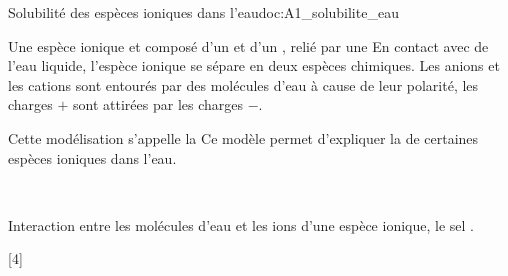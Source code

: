 \begin{doc}{Solubilité des espèces ioniques dans l'eau}{doc:A1_solubilite_eau}
  
  Une espèce ionique et composé d'un  et d'un , relié par une 
  En contact avec de l'eau liquide, l'espèce ionique se sépare en deux espèces chimiques.
  Les anions et les cations sont entourés par des molécules d'eau à cause de leur polarité, les charges $+$ sont attirées par les charges $-$.
  
  Cette modélisation s'appelle la 
  Ce modèle permet d'expliquer la  de certaines espèces ioniques dans l'eau.

  \begin{center}
    ~

    \vspace*{-12pt}
    Interaction entre les molécules d'eau et les ions d'une espèce ionique, le sel .
  \end{center}
\end{doc}

[4]

